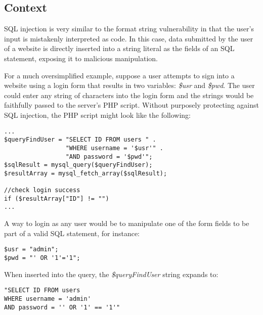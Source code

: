 \subsection{Context} \label{l4_ctx}
SQL injection is very similar to the format string vulnerability in that the user's input is mistakenly interpreted as code. In this case, data submitted by the user of a website is directly inserted into a string literal as the fields of an SQL statement, exposing it to malicious manipulation.

For a much oversimplified example, suppose a user attempts to sign into a website using a login form that results in two variables: \emph{\$usr} and \emph{\$pwd}. The user could enter any string of characters into the login form and the strings would be faithfully passed to the server's PHP script. Without purposely protecting against SQL injection, the PHP script might look like the following:

\begin{minipage}{\linewidth}
\begin{lstlisting}[caption={Vulnerable SQL statement construction},
label={lst:l4_ctx_vulnstm},
frame=single]
...
$queryFindUser = "SELECT ID FROM users " .
                 "WHERE username = '$usr'" .
                 "AND password = '$pwd'";
$sqlResult = mysql_query($queryFindUser);
$resultArray = mysql_fetch_array($sqlResult);

//check login success
if ($resultArray["ID"] != "")
...
\end{lstlisting}
\end{minipage}

A way to login as any user would be to manipulate one of the form fields to be part of a valid SQL statement, for instance:

\begin{minipage}{\linewidth}
\begin{lstlisting}[caption={Malicious login strings passed from the login form},
label={lst:l4_ctx_hackpwd},
frame=single]
$usr = "admin";
$pwd = "' OR '1'='1";
\end{lstlisting}
\end{minipage}

When inserted into the query, the \emph{\$queryFindUser} string expands to:

\begin{minipage}{\linewidth}
\begin{lstlisting}[caption={Vulnerable SQL statement expansion},
label={lst:l4_ctx_hackquery},
frame=single]
"SELECT ID FROM users
WHERE username = 'admin'
AND password = '' OR '1' == '1'"
\end{lstlisting}
\end{minipage}

